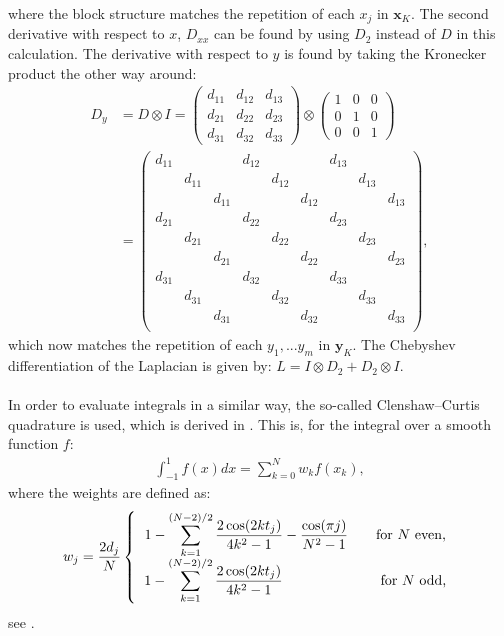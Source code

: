 where the block structure matches the repetition of each $x_j$ in $\mathbf{x}_K$.
The second derivative with respect to $x$, $D_{xx}$ can be found by using $D_2$ instead of $D$ in this calculation. 
The derivative with respect to $y$ is found by taking the Kronecker product the other way around:
\begin{align*}
D_y&=D \otimes I = 
\begin{pmatrix}
d_{11} & d_{12} & d_{13}\\
d_{21} & d_{22} & d_{23} \\
d_{31} & d_{32} & d_{33}
\end{pmatrix}
\otimes
\begin{pmatrix}
1 & 0 & 0\\
0 & 1 & 0 \\
0 & 0 & 1
\end{pmatrix}
\\&=
\begin{pmatrix}
d_{11} & & & d_{12} & & & d_{13} & & \\
& d_{11} & & & d_{12} & & &  d_{13} & \\
& & d_{11} & & &  d_{12} &  & & d_{13}\\
d_{21} & & & d_{22} & & & d_{23} & & \\
& d_{21} & & & d_{22} & & &  d_{23} & \\
& & d_{21} & & &  d_{22} &  & & d_{23}\\
d_{31} & & & d_{32} & & & d_{33} & & \\
& d_{31} & & & d_{32} & & &  d_{33} & \\
& & d_{31} & & &  d_{32} &  & & d_{33}\\
\end{pmatrix},
\end{align*}
which now matches the repetition of each $y_1,...y_m$ in $\mathbf{y}_K$.
The Chebyshev differentiation of the Laplacian is given by: $L=I  \otimes D_2 + D_2 \otimes I$.
\\
\\
In order to evaluate integrals in a similar way, the so-called Clenshaw--Curtis quadrature is used, which is derived in \cite{ClenCurt1}.
This is, for the integral over a smooth function $f$:
\begin{align}\label{eqnClenCurtQuad}
\int_{-1}^1 f(x)dx = \sum_{k=0}^N w_kf(x_k),
\end{align}
where the weights are defined as:
\begin{align*}
w_j = \frac{2d_j}{N}
\left \{
\begin{tabular}{c}
$1- \displaystyle \sum_{k=1}^{(N-2)/2} \frac{2 \cos(2kt_j)}{4k^2-1} - \frac{\cos(\pi j)}{N^2 -1} \quad \quad\text{for $N$ even}$,\\
$1- \displaystyle \sum_{k=1}^{(N-2)/2} \frac{2 \cos(2kt_j)}{4k^2-1} \quad \quad \quad \quad \quad \quad \ \ \ \text{for $N$ odd}$,
\end{tabular}
\right .
\end{align*}
see \cite{GoddardPseudospectralCode1}.

